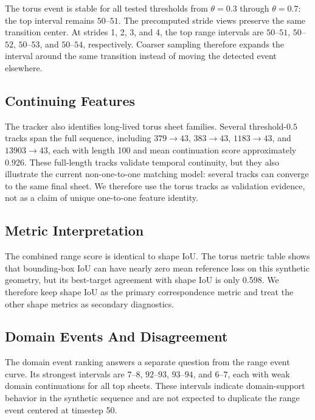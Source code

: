 The torus event is stable for all tested thresholds from \(\theta=0.3\) through
\(\theta=0.7\): the top interval remains \(50\)--\(51\). The precomputed stride
views preserve the same transition center. At strides 1, 2, 3, and 4, the top
range intervals are \(50\)--\(51\), \(50\)--\(52\), \(50\)--\(53\), and
\(50\)--\(54\), respectively. Coarser sampling therefore expands the interval
around the same transition instead of moving the detected event elsewhere.

\subsection{Continuing Features}

The tracker also identifies long-lived torus sheet families. Several
threshold-\(0.5\) tracks span the full sequence, including
\(379\rightarrow43\), \(383\rightarrow43\), \(1183\rightarrow43\), and
\(13903\rightarrow43\), each with length 100 and mean continuation score
approximately 0.926. These full-length tracks validate temporal continuity, but
they also illustrate the current non-one-to-one matching model: several tracks
can converge to the same final sheet. We therefore use the torus tracks as
validation evidence, not as a claim of unique one-to-one feature identity.

\subsection{Metric Interpretation}

The combined range score is identical to shape IoU. The torus metric table
shows that bounding-box IoU can have nearly zero mean reference loss on this
synthetic geometry, but its best-target agreement with shape IoU is only 0.598.
We therefore keep shape IoU as the primary correspondence metric and treat the
other shape metrics as secondary diagnostics.

\subsection{Domain Events And Disagreement}

The domain event ranking answers a separate question from the range event
curve. Its strongest intervals are \(7\)--\(8\), \(92\)--\(93\), \(93\)--\(94\),
and \(6\)--\(7\), each with weak domain continuations for all top sheets. These
intervals indicate domain-support behavior in the synthetic sequence and are
not expected to duplicate the range event centered at timestep 50.

